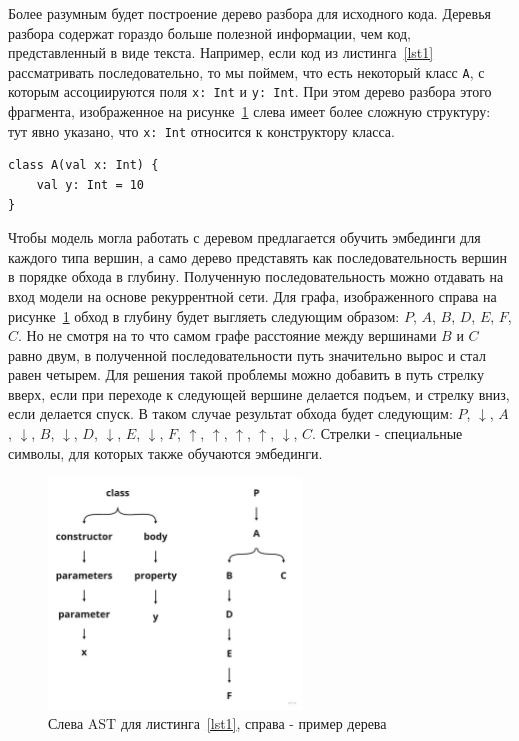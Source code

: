 \documentclass[times,specification,annotation]{itmo-student-thesis}
\begin{document}
Более разумным будет построение дерево разбора для исходного кода. Деревья разбора содержат гораздо больше полезной информации, чем код, представленный в виде текста. Например, если код из листинга~\ref{lst1} рассматривать последовательно, то мы поймем, что есть некоторый класс \texttt{A}, с которым ассоциируются поля \texttt{x: Int} и \texttt{y: Int}. При этом дерево разбора этого фрагмента, изображенное на рисунке~\ref{deep} слева имеет более сложную структуру: тут явно указано, что \texttt{x: Int} относится к конструктору класса.

\begin{lstlisting}[float=!h,caption={Пример исходного кода на Kotlin},label={lst1}]
class A(val x: Int) {
    val y: Int = 10
}
\end{lstlisting}

Чтобы модель могла работать с деревом предлагается обучить эмбединги для каждого типа вершин, а само дерево представять как последовательность вершин в порядке обхода в глубину. Полученную последовательность можно отдавать на вход модели на основе рекуррентной сети. Для графа, изображенного справа на рисунке~\ref{deep} обход в глубину будет выгляеть следующим образом: $P$, $A$, $B$, $D$, $E$, $F$, $C$. Но не смотря на то что самом графе расстояние между вершинами $B$ и $C$ равно двум, в полученной последовательности путь значительно вырос и стал равен четырем. Для решения такой проблемы можно добавить в путь стрелку вверх, если при переходе к следующей вершине делается подъем, и стрелку вниз, если делается спуск. В таком случае результат обхода будет следующим: $P$, $\downarrow$, $A$, $\downarrow$, $B$, $\downarrow$, $D$, $\downarrow$, $E$, $\downarrow$, $F$, $\uparrow$, $\uparrow$, $\uparrow$, $\uparrow$, $\downarrow$, $C$. Стрелки - специальные символы, для которых также обучаются эмбединги.

\begin{figure}[!h]
    \caption{Слева AST для листинга~\ref{lst1}, справа - пример дерева}\label{deep}
    \centering
    \includegraphics[width=0.6\textwidth]{deep.jpg}
\end{figure}
\end{document}
